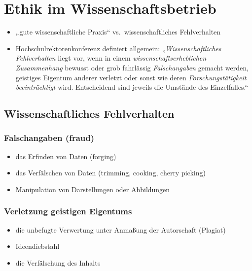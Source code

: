 \documentclass[
]{book}
\begin{document}
\hypertarget{ethik-im-wissenschaftsbetrieb}{%
\section{Ethik im Wissenschaftsbetrieb}\label{ethik-im-wissenschaftsbetrieb}}

\begin{itemize}
\item
  „gute wissenschaftliche Praxis`` vs.~wissenschaftliches Fehlverhalten
\item
  Hochschulrektorenkonferenz definiert allgemein: „\emph{Wissenschaftliches Fehlverhalten} liegt vor, wenn in einem \emph{wissenschaftserheblichen Zusammenhang} bewusst oder grob fahrlässig \emph{Falschangaben} gemacht werden, geistiges Eigentum anderer verletzt oder sonst wie deren \emph{Forschungstätigkeit beeinträchtigt} wird. Entscheidend sind jeweils die Umstände des Einzelfalles.``
\end{itemize}

\hypertarget{wissenschaftliches-fehlverhalten}{%
\subsection{Wissenschaftliches Fehlverhalten}\label{wissenschaftliches-fehlverhalten}}

\hypertarget{falschangaben-fraud}{%
\subsubsection{Falschangaben (fraud)}\label{falschangaben-fraud}}

\begin{itemize}
\item
  das Erfinden von Daten (forging)
\item
  das Verfälschen von Daten (trimming, cooking, cherry picking)
\item
  Manipulation von Darstellungen oder Abbildungen
\end{itemize}

\hypertarget{verletzung-geistigen-eigentums}{%
\subsubsection{Verletzung geistigen Eigentums}\label{verletzung-geistigen-eigentums}}

\begin{itemize}
\item
  die unbefugte Verwertung unter Anmaßung der Autorschaft (Plagiat)
\item
  Ideendiebstahl
\item
  die Verfälschung des Inhalts
\end{itemize}
\end{document}
